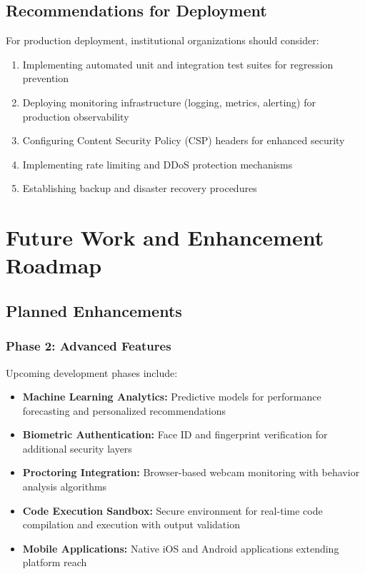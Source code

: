 \documentclass[12pt,a4paper]{report}
\begin{document}
\section{Recommendations for Deployment}

For production deployment, institutional organizations should consider:

\begin{enumerate}[left=0pt]
  \item Implementing automated unit and integration test suites for regression prevention
  \item Deploying monitoring infrastructure (logging, metrics, alerting) for production observability
  \item Configuring Content Security Policy (CSP) headers for enhanced security
  \item Implementing rate limiting and DDoS protection mechanisms
  \item Establishing backup and disaster recovery procedures
\end{enumerate}

\cleardoublepage


\chapter{Future Work and Enhancement Roadmap}

\section{Planned Enhancements}

\subsection{Phase 2: Advanced Features}

Upcoming development phases include:

\begin{itemize}[left=0pt]
  \item \textbf{Machine Learning Analytics:} Predictive models for performance forecasting and personalized recommendations
  \item \textbf{Biometric Authentication:} Face ID and fingerprint verification for additional security layers
  \item \textbf{Proctoring Integration:} Browser-based webcam monitoring with behavior analysis algorithms
  \item \textbf{Code Execution Sandbox:} Secure environment for real-time code compilation and execution with output validation
  \item \textbf{Mobile Applications:} Native iOS and Android applications extending platform reach
\end{itemize}
\end{document}
